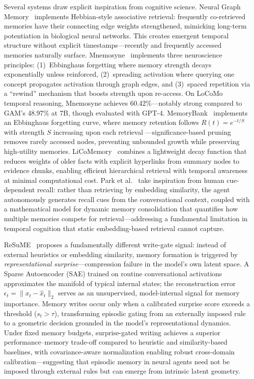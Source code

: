 \documentclass[hf]{ceurart}
\begin{document}
Several systems draw explicit inspiration from cognitive science.
Neural Graph Memory~\cite{neuralgraphmem2025} implements Hebbian-style
associative retrieval: frequently co-retrieved memories have their
connecting edge weights strengthened, mimicking long-term potentiation
in biological neural networks. This creates emergent temporal structure
without explicit timestamps---recently and frequently accessed memories
naturally surface.
Mnemosyne~\cite{mnemosyne2025} implements three neuroscience
principles: (1)~Ebbinghaus forgetting where memory strength decays
exponentially unless reinforced, (2)~spreading activation where
querying one concept propagates activation through graph edges, and
(3)~spaced repetition via a ``rewind'' mechanism that boosts strength
upon re-access. On LoCoMo temporal reasoning, Mnemosyne achieves
60.42\%---notably strong compared to GAM's 48.97\% at 7B, though
evaluated with GPT-4.
MemoryBank~\cite{memorybank2024} implements an Ebbinghaus
forgetting curve, where memory retention follows
$R(t) = e^{-t/S}$ with strength $S$ increasing upon each retrieval
---significance-based pruning removes rarely accessed nodes,
preventing unbounded growth while preserving high-utility memories.
LiCoMemory~\cite{licomemory2025} combines a lightweight decay function
that reduces weights of older facts with explicit hyperlinks from
summary nodes to evidence chunks, enabling efficient hierarchical
retrieval with temporal awareness at minimal computational cost.
Park et al.~\cite{humanlikemem2024} take inspiration from human
cue-dependent recall: rather than retrieving by embedding similarity,
the agent autonomously generates recall cues from the conversational
context, coupled with a mathematical model for dynamic memory
consolidation that quantifies how multiple memories compete for
retrieval---addressing a fundamental limitation in temporal cognition
that static embedding-based retrieval cannot capture.

ReSuME~\cite{resume2026} proposes a fundamentally different
write-gate signal: instead of external heuristics or embedding similarity,
memory formation is triggered by \emph{representational surprise}---compression
failure in the model's own latent space. A Sparse Autoencoder (SAE) trained
on routine conversational activations approximates the manifold of typical
internal states; the reconstruction error
$\epsilon_t = \|x_t - \hat{x}_t\|_2$ serves as an unsupervised,
model-internal signal for memory importance. Memory writes occur only when
a calibrated surprise score exceeds a threshold ($s_t > \tau$),
transforming episodic gating from an externally imposed rule to a
geometric decision grounded in the model's representational dynamics.
Under fixed memory budgets, surprise-gated writing achieves a superior
performance--memory trade-off compared to heuristic and similarity-based
baselines, with covariance-aware normalization enabling robust cross-domain
calibration---suggesting that episodic memory in neural agents need not
be imposed through external rules but can emerge from intrinsic latent
geometry.
\end{document}
